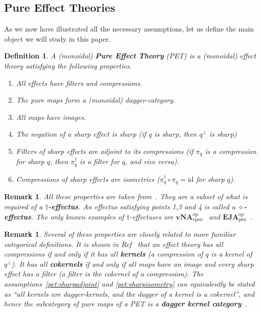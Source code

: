 \documentclass[b5paper,onecolumn,12pt,accepted=2019-05-03, issue=1, volume=1, shorttitle=papers/compositionality-1-1]{compositionalityarticle}
\newcounter{counter}
\numberwithin{counter}{section}
\newtheorem{definition}[counter]{Definition}
\newtheorem{remark}[counter]{Remark}
\newcommand{\id}{\text{id}}
\newcommand{\opp}{\text{op}}
\begin{document}
\subsection{Pure Effect Theories}

As we now have illustrated all the necessary assumptions, let us define the main object we will study in this paper.

\begin{definition}\label{def:PET}
    A (monoidal) \textbf{Pure Effect Theory} (PET) is a (monoidal) effect theory satisfying the following properties.
    \begin{enumerate}[label=({P}\theenumi), ref=P\theenumi]
        \item \label{pet:filtcompr} All effects have filters and compressions.
        \item \label{pet:dagger} The pure maps form a (monoidal) dagger-category.
        \item \label{pet:images} All maps have images.
        \item \label{pet:sharpnegation} The negation of a sharp effect is sharp (if $q$ is sharp, then $q^\perp$ is sharp)
        \item \label{pet:sharpadjoint} Filters of sharp effects are adjoint to its compressions (if $\pi_q$ is a compression for sharp $q$, then $\pi_q^\dagger$ is a filter for $q$, and vice versa).
        \item \label{pet:sharpisometry} Compressions of sharp effects are isometries ($\pi_q^\dagger\circ\pi_q = \id$ for sharp $q$).
    \end{enumerate}
\end{definition}

\begin{remark}
    All these properties are taken from~\cite{basthesis}. They are a subset of what is required of a \textbf{$\dagger$-effectus}. An effectus satisfying points 1,3 and 4 is called a \textbf{$\diamond$-effectus}. The only known examples of $\dagger$-effectuses are $\textbf{vNA}^\opp_{\text{cpsu}}$~\cite{bramthesis} and $\textbf{EJA}^\opp_{\text{psu}}$~\cite{westerbaan2018puremaps}.
\end{remark}

\begin{remark}
    Several of these properties are closely related to more familiar categorical definitions. It is shown in Ref~\cite{basthesis} that an effect theory has all compressions if and only if it has all \textbf{kernels} (a compression of $q$ is a kernel of $q^\perp$). It has all \textbf{cokernels} if and only if all maps have an image and every sharp effect has a filter (a filter is the cokernel of a compression). The assumptions~\ref{pet:sharpadjoint} and \ref{pet:sharpisometry} can equivalently be stated as ``all kernels are dagger-kernels, and the dagger of a kernel is a cokernel'', and hence the subcategory of pure maps of a PET is a \textbf{dagger kernel category}~\cite{heunen2010quantum}.
\end{remark}
\end{document}
